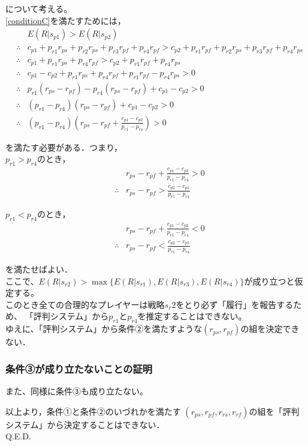 について考える。\\

\eqref{conditionC}を満たすためには，
\begin{eqnarray*}
  &&E(R |s_{p1}) > E(R |s_{p2}) \\
  &\therefore& c_{p1} + p_{r1} r_{ps} + p_{r2} r_{ps} + p_{r3} r_{pf} + p_{r4} r_{pf} > c_{p2} + p_{r1} r_{pf} + p_{r2} r_{ps} + p_{r3} r_{pf} + p_{r4} r_{ps} \\
  &\therefore& c_{p1} + p_{r1} r_{ps} + p_{r4} r_{pf} > c_{p2} + p_{r1} r_{pf} + p_{r4} r_{ps} \\
  &\therefore& c_{p1} - c_{p2} + p_{r1} r_{ps} + p_{r4} r_{pf} + p_{r1} r_{pf} - p_{r4} r_{ps} > 0 \\
  &\therefore& p_{r1}(r_{ps} - r_{pf}) - p_{r4}(r_{ps} - r_{pf}) + c_{p1} - c_{p2} > 0 \\
  &\therefore& (p_{r1} - p_{r4})(r_{ps} - r_{pf}) + c_{p1} - c_{p2} > 0 \\
  &\therefore& (p_{r1} - p_{r4})(r_{ps} - r_{pf} + \frac{ c_{p1} - c_{p2} }{p_{r1} - p_{r4}}) > 0
\end{eqnarray*}

を満たす必要がある．つまり，\\

$p_{r1} > p_{r4}$のとき， 
\begin{eqnarray}
  &&r_{ps} - r_{pf} + \frac{ c_{p1} - c_{p2} }{p_{r1} - p_{r4}} > 0\nonumber \\
  &\therefore&r_{ps} - r_{pf} > \frac{ c_{p2} - c_{p1} }{ p_{r1} - p_{r4} } \nonumber
\end{eqnarray}

$p_{r1} < p_{r4}$のとき， 
\begin{eqnarray}
  &&r_{ps} - r_{pf} + \frac{ c_{p1} - c_{p2} }{p_{r1} - p_{r4}} < 0 \nonumber \\
  &\therefore&r_{ps} - r_{pf} < \frac{ c_{p2} - c_{p1} }{ p_{r1} - p_{r4} } \nonumber
\end{eqnarray}

を満たせばよい．\\

ここで、$E(R|s_{r2})>\max\{E(R|s_{r1}), E(R|s_{r3}), E(R|s_{r4}) \}$が成り立つと仮定する。\\

このとき全ての合理的なプレイヤーは戦略$s_r2$をとり必ず「履行」を報告するため、
「評判システム」から$p_{r1}$と$p_{r4}$を推定することはできない。\\

ゆえに、「評判システム」から条件②を満たすような$(r_{ps}, r_{pf})$の組を決定できない．\\

\subsubsection{条件③が成り立たないことの証明}
また、同様に条件③も成り立たない。

以上より，条件①と条件②のいづれかを満たす
$(r_{ps}, r_{pf},r_{rs},r_{rf})$の組を「評判システム」から決定することはできない．\\

Q.E.D. \\
